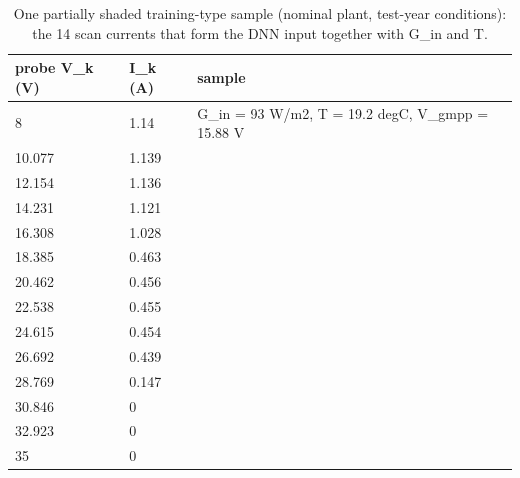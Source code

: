\begin{table}[t]
\centering
\caption{One partially shaded training-type sample (nominal plant, test-year conditions): the 14 scan currents that form the DNN input together with G\_in and T.}
\label{tab:Table_Dataset_Excerpt_Scan}
\small
\begin{tabular}{lll}
\hline
probe V\_k (V) & I\_k (A) & sample \\
\hline
8 & 1.14 & G\_in = 93 W/m2, T = 19.2 degC, V\_gmpp = 15.88 V \\
10.077 & 1.139 &  \\
12.154 & 1.136 &  \\
14.231 & 1.121 &  \\
16.308 & 1.028 &  \\
18.385 & 0.463 &  \\
20.462 & 0.456 &  \\
22.538 & 0.455 &  \\
24.615 & 0.454 &  \\
26.692 & 0.439 &  \\
28.769 & 0.147 &  \\
30.846 & 0 &  \\
32.923 & 0 &  \\
35 & 0 &  \\
\hline
\end{tabular}
\end{table}
